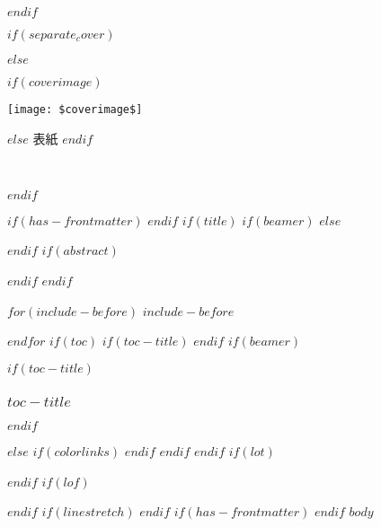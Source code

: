 $endif$



$if(separate_cover)$

$else$

$if(coverimage)$

\enlargethispage{\paperwidth}
\thispagestyle{empty}
\vspace*{-1truein}
\vspace*{-\topmargin}
\vspace*{-\headheight}
\vspace*{-\headsep}
\vspace*{-\topskip}
\noindent\hspace*{-1in}\hspace*{-\oddsidemargin}
\texttt{[image: \$coverimage\$]}

$else$
表紙
$endif$

\clearpage
\clearpage

$endif$


$if(has-frontmatter)$
\frontmatter
$endif$
$if(title)$
$if(beamer)$
\frame{\titlepage}
$else$
\maketitle
$endif$
$if(abstract)$
\begin{abstract}
$abstract$
\end{abstract}
$endif$
$endif$

\clearpage  %

\pagestyle{headings}

$for(include-before)$
$include-before$

$endfor$
$if(toc)$
$if(toc-title)$
\renewcommand*\contentsname{$toc-title$}
$endif$
$if(beamer)$
\begin{frame}
$if(toc-title)$
  \frametitle{$toc-title$}
$endif$
  \tableofcontents[hideallsubsections]
\end{frame}
$else$
{
$if(colorlinks)$
\hypersetup{linkcolor=$if(toccolor)$$toccolor$$else$$endif$}
$endif$
\setcounter{tocdepth}{$toc-depth$}
\tableofcontents
}
$endif$
$endif$
$if(lot)$
\listoftables
$endif$
$if(lof)$
\listoffigures
$endif$
$if(linestretch)$
$endif$
$if(has-frontmatter)$
\mainmatter
$endif$
$body$


